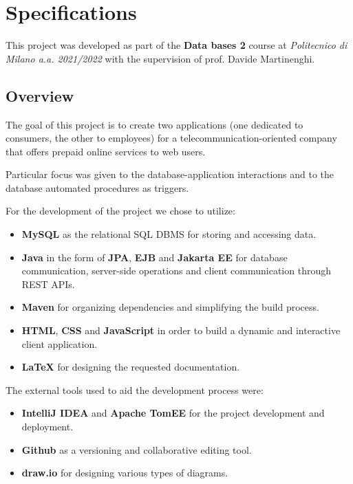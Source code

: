 
\chapter{Specifications}
\label{chap:specifications}

This project was developed as part of the \textbf{Data bases 2} course at \textit{Politecnico di Milano a.a. 2021/2022} with the supervision of prof. Davide Martinenghi.


\section{Overview}
\label{sec:overview}

The goal of this project is to create two applications (one dedicated to consumers, the other to employees) for a telecommunication-oriented company that offers prepaid online services to web users. 

Particular focus was given to the database-application interactions and to the database automated procedures as triggers. 

For the development of the project we chose to utilize:
\begin{itemize}
    \item \textbf{MySQL} as the relational SQL DBMS for storing and accessing data.
    \item \textbf{Java} in the form of \textbf{JPA}, \textbf{EJB} and \textbf{Jakarta EE} for database communication, server-side operations and client communication through REST APIs.
    \item \textbf{Maven} for organizing dependencies and simplifying the build process.
    \item \textbf{HTML}, \textbf{CSS} and \textbf{JavaScript} in order to build a dynamic and interactive client application.
    \item \textbf{\LaTeX} for designing the requested documentation.
\end{itemize}

The external tools used to aid the development process were:
\begin{itemize}
    \item \textbf{IntelliJ IDEA} and \textbf{Apache TomEE} for the project development and deployment.
    \item \textbf{Github} as a versioning and collaborative editing tool.
    \item \textbf{draw.io} for designing various types of diagrams.
\end{itemize}

